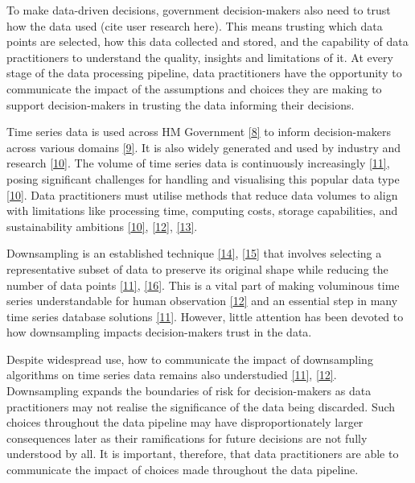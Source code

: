 \documentclass{article}
\begin{document}
To make data-driven decisions, government decision-makers also need to
trust how the data used (cite user research here). This means trusting
which data points are selected, how this data collected and stored, and
the capability of data practitioners to understand the quality, insights
and limitations of it. At every stage of the data processing pipeline,
data practitioners have the opportunity to communicate the impact of the
assumptions and choices they are making to support decision-makers in
trusting the data informing their decisions.

Time series data is used across HM Government
\protect\hyperlink{ref-pathway}{{[}8{]}} to inform decision-makers
across various domains \protect\hyperlink{ref-onstool}{{[}9{]}}. It is
also widely generated and used by industry and research
\protect\hyperlink{ref-TVStore}{{[}10{]}}. The volume of time series
data is continuously increasingly
\protect\hyperlink{ref-datapoint}{{[}11{]}}, posing significant
challenges for handling and visualising this popular data type
\protect\hyperlink{ref-TVStore}{{[}10{]}}. Data practitioners must
utilise methods that reduce data volumes to align with limitations like
processing time, computing costs, storage capabilities, and
sustainability ambitions \protect\hyperlink{ref-TVStore}{{[}10{]}},
\protect\hyperlink{ref-Sveinn}{{[}12{]}},
\protect\hyperlink{ref-Shift}{{[}13{]}}.

Downsampling is an established technique
\protect\hyperlink{ref-downsampling}{{[}14{]}},
\protect\hyperlink{ref-sampling}{{[}15{]}} that involves selecting a
representative subset of data to preserve its original shape while
reducing the number of data points
\protect\hyperlink{ref-datapoint}{{[}11{]}},
\protect\hyperlink{ref-MinMaxLTTB}{{[}16{]}}. This is a vital part of
making voluminous time series understandable for human observation
\protect\hyperlink{ref-Sveinn}{{[}12{]}} and an essential step in many
time series database solutions
\protect\hyperlink{ref-datapoint}{{[}11{]}}. However, little attention
has been devoted to how downsampling impacts decision-makers trust in
the data.

Despite widespread use, how to communicate the impact of downsampling
algorithms on time series data remains also understudied
\protect\hyperlink{ref-datapoint}{{[}11{]}},
\protect\hyperlink{ref-Sveinn}{{[}12{]}}. Downsampling expands the
boundaries of risk for decision-makers as data practitioners may not
realise the significance of the data being discarded. Such choices
throughout the data pipeline may have disproportionately larger
consequences later as their ramifications for future decisions are not
fully understood by all. It is important, therefore, that data
practitioners are able to communicate the impact of choices made
throughout the data pipeline.
\end{document}
